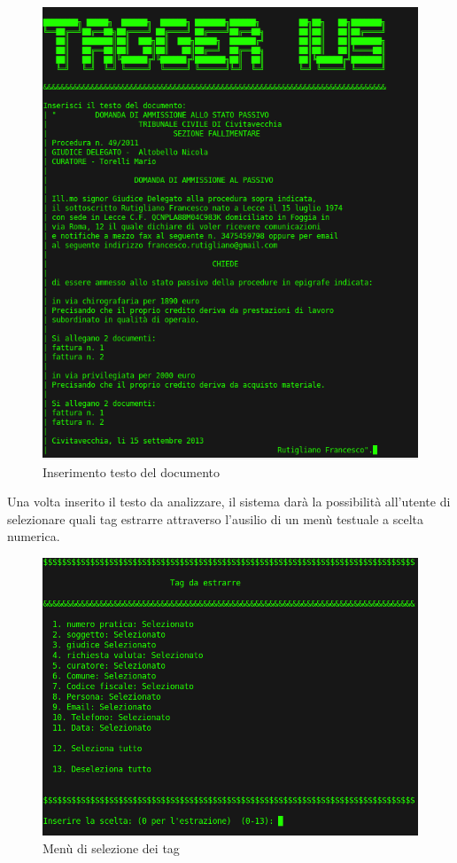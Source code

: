 \begin{figure}[H]
	\includegraphics[width=1\textwidth]{img/interfaces/bash-document.png}
	\caption[Schermata bash document]{Inserimento testo del documento}
	\label{bash-doc}
\end{figure}

Una volta inserito il testo da analizzare, il sistema darà la possibilità all'utente di selezionare quali tag estrarre attraverso l'ausilio di un menù testuale a scelta numerica.

\begin{figure}[H]
	\includegraphics[width=1\textwidth]{img/interfaces/bash-tagSelect.png}
	\caption[Schermata bash tag select]{Menù di selezione dei tag}
	\label{bash-tagSelect}
\end{figure}

